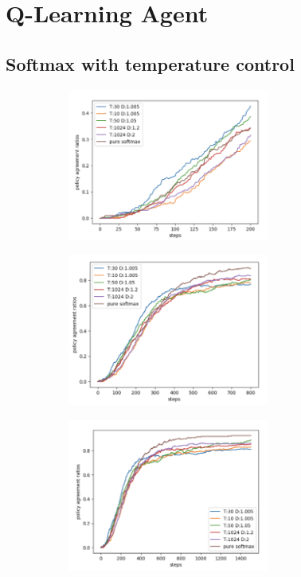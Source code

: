 \documentclass{article}
\title{}
\author{}
\begin{document}
\section{Q-Learning Agent}
\subsection{Softmax with temperature control}
\begin{figure}[h]
	\begin{subfigure}{0.5\textwidth}
		\includegraphics[width=0.9\linewidth, height=5cm]{images/temp_0_200.png} 
		\caption{}
	\end{subfigure}
	\begin{subfigure}{0.5\textwidth}
		\includegraphics[width=0.9\linewidth, height=5cm]{images/temp_0_800.png}
		\caption{}
	\end{subfigure}
	\begin{subfigure}{0.5\textwidth}
		\includegraphics[width=0.9\linewidth, height=5cm]{images/temp_0_1500.png}
		\caption{}
	\end{subfigure}

\end{figure}
\end{document}
